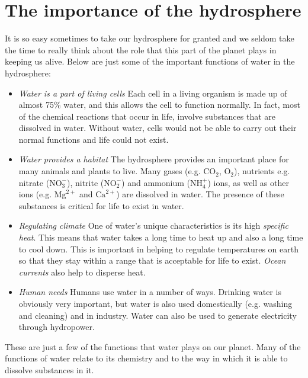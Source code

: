     \section{The importance of the hydrosphere}
            \nopagebreak
      \label{m38138*id335077}It is so easy sometimes to take our hydrosphere for granted and we seldom take the time to really think about the role that this part of the planet plays in keeping us alive. Below are just some of the important functions of water in the hydrosphere:\par 
      \label{m38138*id335082}\begin{itemize}[noitemsep]
            \label{m38138*uid15}\item \textsl{Water is a part of living cells}
Each cell in a living organism is made up of almost 75\% water, and this allows the cell to function normally. In fact, most of the chemical reactions that occur in life, involve substances that are dissolved in water. Without water, cells would not be able to carry out their normal functions and life could not exist.
\label{m38138*uid16}\item \textsl{Water provides a habitat}
The hydrosphere provides an important place for many animals and plants to live. Many gases (e.g.\@{} ${\text{CO}}_{2}$, ${\text{O}}_{2}$), nutrients e.g.\@{} nitrate ($\text{NO}_{3}^{-}$), nitrite ($\text{NO}_{2}^{-}$) and ammonium ($\text{NH}_{4}^{+}$) ions, as well as other ions (e.g.\@{} ${\text{Mg}}^{2+}$ and ${\text{Ca}}^{2+}$) are dissolved in water. The presence of these substances is critical for life to exist in water.
\label{m38138*uid17}\item \textsl{Regulating climate}
One of water's unique characteristics is its high \textsl{specific heat}. This means that water takes a long time to heat up and also a long time to cool down. This is important in helping to regulate temperatures on earth so that they stay within a range that is acceptable for life to exist. \textsl{Ocean currents} also help to disperse heat.
\label{m38138*uid18}\item \textsl{Human needs}
Humans use water in a number of ways. Drinking water is obviously very important, but water is also used domestically (e.g.\@{} washing and cleaning) and in industry. Water can also be used to generate electricity through hydropower.
\end{itemize}
      \label{m38138*id335280}These are just a few of the functions that water plays on our planet. Many of the functions of water relate to its chemistry and to the way in which it is able to dissolve substances in it.\par 
